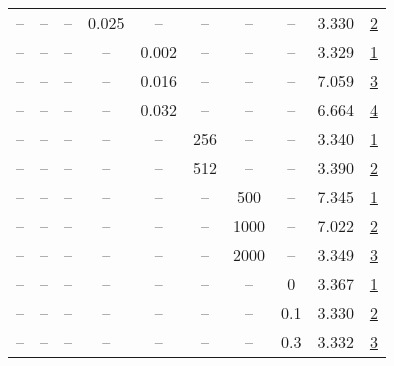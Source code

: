 \begin{table}[H]
\begin{tabular}{cccccccccc}
-- & -- & -- & 0.025 & -- & -- & -- & -- & 3.330 & \href{https://wandb.ai/stanford-mercury/optimizer-scaling/runs/sweep-130m-10B-sophiam032e0dlr0.004-wd0.2-minlr0-warmup4000-b10.-b9dfba}{2} \\
-- & -- & -- & -- & 0.002 & -- & -- & -- & 3.329 & \href{https://wandb.ai/stanford-mercury/optimizer-scaling/runs/sweep-130m-10B-sophiam3685d5lr0.002-wd0.2-minlr0-warmup4000-b10.-f1e565}{1} \\
-- & -- & -- & -- & 0.016 & -- & -- & -- & 7.059 & \href{https://wandb.ai/stanford-mercury/optimizer-scaling/runs/sweep-130m-10B-sophiam684f24lr0.016-wd0.2-minlr0-warmup4000-b10.-6d1fe0}{3} \\
-- & -- & -- & -- & 0.032 & -- & -- & -- & 6.664 & \href{https://wandb.ai/stanford-mercury/optimizer-scaling/runs/sweep-130m-10B-sophiam3beb76lr0.032-wd0.2-minlr0-warmup4000-b10.-31de08}{4} \\
-- & -- & -- & -- & -- & 256 & -- & -- & 3.340 & \href{https://wandb.ai/stanford-mercury/optimizer-scaling/runs/sweep-130m-10B-sophiam060b57lr0.004-wd0.2-minlr0-warmup4000-b10.-f3b5aa}{1} \\
-- & -- & -- & -- & -- & 512 & -- & -- & 3.390 & \href{https://wandb.ai/stanford-mercury/optimizer-scaling/runs/sweep-130m-10B-sophiam2211e4lr0.004-wd0.2-minlr0-warmup4000-b10.-f633bb}{2} \\
-- & -- & -- & -- & -- & -- & 500 & -- & 7.345 & \href{https://wandb.ai/stanford-mercury/optimizer-scaling/runs/sweep-130m-10B-sophiamcb63d7lr0.004-wd0.2-minlr0-warmup500-b10.9-ad427c}{1} \\
-- & -- & -- & -- & -- & -- & 1000 & -- & 7.022 & \href{https://wandb.ai/stanford-mercury/optimizer-scaling/runs/sweep-130m-10B-sophiama20637lr0.004-wd0.2-minlr0-warmup1000-b10.-8ef81c}{2} \\
-- & -- & -- & -- & -- & -- & 2000 & -- & 3.349 & \href{https://wandb.ai/stanford-mercury/optimizer-scaling/runs/sweep-130m-10B-sophiam6051c1lr0.004-wd0.2-minlr0-warmup2000-b10.-3ac3ce}{3} \\
-- & -- & -- & -- & -- & -- & -- & 0 & 3.367 & \href{https://wandb.ai/stanford-mercury/optimizer-scaling/runs/sweep-130m-10B-sophiam0dbf87lr0.004-wd0-minlr0-warmup4000-b10.95-18f4fc}{1} \\
-- & -- & -- & -- & -- & -- & -- & 0.1 & 3.330 & \href{https://wandb.ai/stanford-mercury/optimizer-scaling/runs/sweep-130m-10B-sophiam0ca1f6lr0.004-wd0.1-minlr0-warmup4000-b10.-810b8d}{2} \\
-- & -- & -- & -- & -- & -- & -- & 0.3 & 3.332 & \href{https://wandb.ai/stanford-mercury/optimizer-scaling/runs/sweep-130m-10B-sophiam1a4eb8lr0.004-wd0.3-minlr0-warmup4000-b10.-c20359}{3} \\
\bottomrule
\end{tabular}
\end{table}

